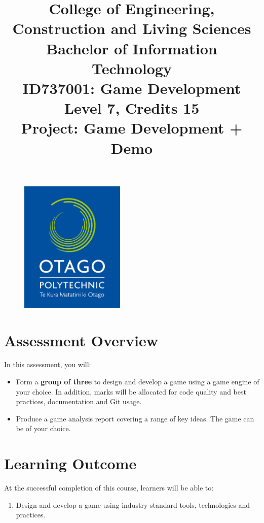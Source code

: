 \documentclass{article}
\author{}
\begin{document}
\begin{figure}
	\centering
	\includegraphics[width=50mm]{../../resources/img/logo.jpg}
\end{figure}

\title{College of Engineering, Construction and Living Sciences\\Bachelor of Information Technology\\ID737001: Game Development\\Level 7, Credits 15\\\textbf{Project: Game Development + Demo}}
\date{}
\maketitle

\section*{Assessment Overview}
In this assessment, you will:
\begin{itemize}
	\item Form a \textbf{group of three} to design and develop a game using a game engine of your choice. In addition, marks will be allocated for code quality and best practices, documentation and Git usage.
	\item Produce a game analysis report covering a range of key ideas. The game can be of your choice. 
\end{itemize}

\section*{Learning Outcome}
At the successful completion of this course, learners will be able to:
\begin{enumerate}
	\item Design and develop a game using industry standard tools, technologies and practices.
\end{enumerate}
\end{document}
